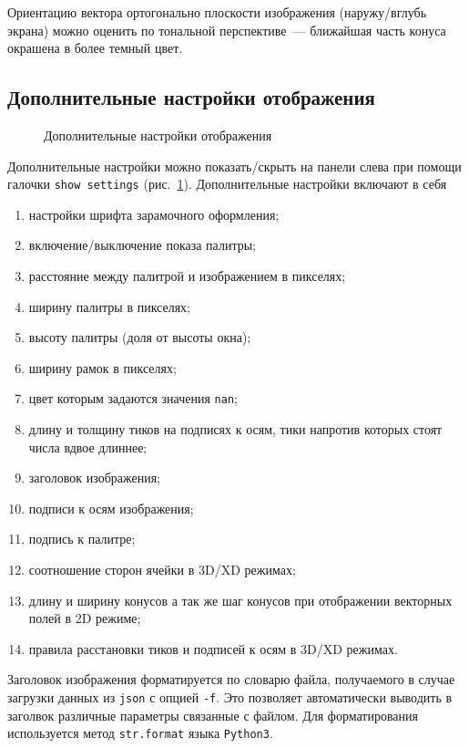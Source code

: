 \documentclass[12pt]{article}
\begin{document}
Ориентацию вектора ортогонально плоскости изображения (наружу/вглубь экрана) можно оценить по тональной перспективе~---
ближайшая часть конуса окрашена в более темный цвет.


\subsection{Дополнительные настройки отображения}
\begin{figure}[h]
  \begin{center}
  \end{center}
  \caption{Дополнительные настройки отображения}\label{settings:pict}
\end{figure}
Дополнительные настройки можно показать/скрыть на панели слева при помощи галочки \verb'show settings' (рис.~\ref{settings:pict}).
Дополнительные настройки включают в себя
\begin{enumerate}
\item настройки шрифта зарамочного оформления;
\item включение/выключение показа палитры;
\item расстояние между палитрой и изображением в пикселях;
\item ширину палитры в пикселях;
\item высоту палитры (доля от высоты окна);
\item ширину рамок в пикселях;
\item цвет которым задаются значения \verb'nan';
\item длину и толщину тиков на подписях к осям, тики напротив которых стоят числа вдвое длиннее;
\item заголовок изображения;
\item подписи к осям изображения;
\item подпись к палитре;
\item соотношение сторон ячейки в 3D/XD режимах;
\item длину и ширину конусов а так же шаг конусов при отображении векторных полей в 2D режиме;
\item правила расстановки тиков и подписей к осям в 3D/XD режимах.
\end{enumerate}

Заголовок изображения форматируется по словарю файла, получаемого в случае загрузки данных из \verb'json'  с опцией \verb'-f'.
Это позволяет автоматически выводить в заголвок различные параметры связанные с файлом. Для форматирования используется
метод \verb'str.format' языка \verb'Python3'.
\end{document}

